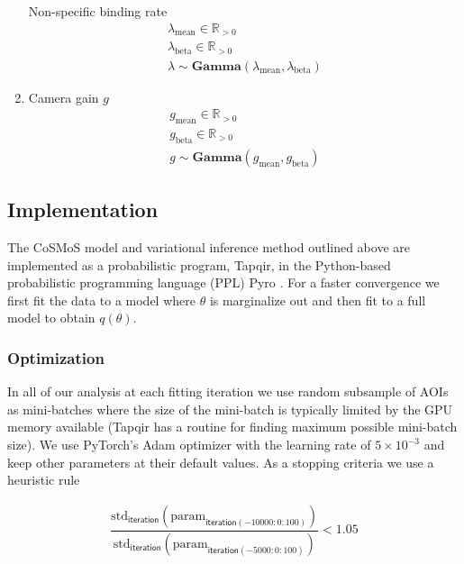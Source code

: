 \begin{enumerate}
    Non-specific binding rate
    \begin{gather*}
        \lambda_\mathrm{mean} \in \mathbb{R}_{>0} \\
        \lambda_\mathrm{beta} \in \mathbb{R}_{>0} \\
        \lambda \sim \mathbf{Gamma}(\lambda_\mathrm{mean}, \lambda_\mathrm{beta})
    \end{gather*}
    
    \item Camera gain $g$
    \begin{gather*}
        g_\mathrm{mean} \in \mathbb{R}_{>0} \\
        g_\mathrm{beta} \in \mathbb{R}_{>0} \\
        g \sim \mathbf{Gamma}(g_\mathrm{mean}, g_\mathrm{beta})
    \end{gather*}
\end{enumerate}

\subsection*{Implementation}

The CoSMoS model and variational inference method outlined above are implemented as a probabilistic program, Tapqir, in the Python-based probabilistic programming language (PPL) Pyro \cite{Bingham2019-qy,Obermeyer2019-xt}. For a faster convergence we first fit the data to a model where $\theta$ is marginalize out and then fit to a full model to obtain $q(\theta)$.

\subsubsection*{Optimization}

In all of our analysis at each fitting iteration we use random subsample of AOIs as mini-batches where the size of the mini-batch is typically limited by the GPU memory available (Tapqir has a routine for finding maximum possible mini-batch size). We use PyTorch's Adam optimizer with the learning rate of $5\times 10^{-3}$ and keep other parameters at their default values. As a stopping criteria we use a heuristic rule

\begin{gather*}
    \dfrac{\mathrm{std}_\mathsf{iteration}(\mathrm{param}_{\mathsf{iteration}(-10000:0:100)})}{\mathrm{std}_\mathsf{iteration}(\mathrm{param}_{\mathsf{iteration}(-5000:0:100)})} < 1.05
\end{gather*}

